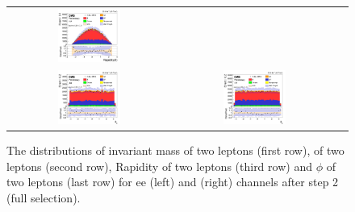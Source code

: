 \begin{figure}[ht]
\begin{center}
\begin{tabular}{ccc}
      \includegraphics[width=0.4\textwidth]{figures/tW/fig/Step2/mumu/H_Rll.png}\\
      \includegraphics[width=0.4\textwidth]{figures/tW/fig/Step2/ee/H_Ptll_phi.png}&
      \includegraphics[width=0.4\textwidth]{figures/tW/fig/Step2/mumu/H_Ptll_phi.png}\\
    \end{tabular}
    \caption{The distributions of invariant mass of two leptons (first row), \pt of two leptons (second row), Rapidity of two leptons (third row) and $\phi$ of two leptons (last row) for ee (left) and \mumu (right) channels after step 2 (full selection).
    \label{fig:step2_M_pt_R_phi}}
  \end{center}
\end{figure}


